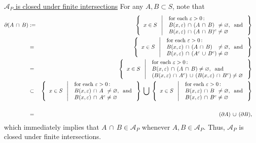 \vskip 0.2cm
\noindent
\underline{$\mathcal{A}_{P}$ is closed under finite intersections}
\vskip 0.1cm
\noindent
For any $A, B \subset S$, note that
\begin{eqnarray*}
\partial(A\,\cap\,B)
& := &
	\left\{\;\;
	x \in S
	\;\;\left\vert\;\;
	\begin{array}{l}
		\textnormal{for each $\varepsilon > 0$\,:}
		\\
		B(x,\varepsilon) \,\cap\,(A\,\cap\,B) \;\,\neq \varnothing,\;\;\textnormal{and}
		\\
		B(x,\varepsilon) \,\cap\,(A\,\cap\,B)^{c} \neq \varnothing
		\\
	\end{array}
	\right.
	\,\right\}
\\
& = &
	\left\{\;\;
	x \in S
	\;\;\left\vert\;\;
	\begin{array}{l}
		\textnormal{for each $\varepsilon > 0$\,:}
		\\
		B(x,\varepsilon) \,\cap\,(A\,\cap\,B) \;\;\;\neq \varnothing,\;\;\textnormal{and}
		\\
		B(x,\varepsilon) \,\cap\,(A^{c}\,\cup\,B^{c}) \neq \varnothing
		\\
	\end{array}
	\right.
	\,\right\}
\\
& = &
	\left\{\;\;
	x \in S
	\;\;\left\vert\;\;
	\begin{array}{l}
		\textnormal{for each $\varepsilon > 0$\,:}
		\\
		B(x,\varepsilon) \,\cap\,(A\,\cap\,B) \neq \varnothing,\;\;\textnormal{and}
		\\
		(B(x,\varepsilon) \,\cap\,A^{c})\,\cup\,(B(x,\varepsilon)\,\cap\,B^{c}) \neq \varnothing
		\\
	\end{array}
	\right.
	\,\right\}
\\
& \subset &
	\left\{\;\;
	x \in S
	\;\;\left\vert\;\;
	\begin{array}{l}
		\textnormal{for each $\varepsilon > 0$\,:}
		\\
		B(x,\varepsilon) \,\cap\,A  \;\,\neq \varnothing,\;\;\textnormal{and}
		\\
		B(x,\varepsilon) \,\cap\,A^{c}\neq \varnothing
		\\
	\end{array}
	\right.
	\,\right\}
	\;\bigcup\;
	\left\{\;\;
	x \in S
	\;\;\left\vert\;\;
	\begin{array}{l}
		\textnormal{for each $\varepsilon > 0$\,:}
		\\
		B(x,\varepsilon) \,\cap\,B  \;\,\neq \varnothing,\;\;\textnormal{and}
		\\
		B(x,\varepsilon) \,\cap\,B^{c}\neq \varnothing
		\\
	\end{array}
	\right.
	\,\right\}
\\
\\
&=& (\partial A) \,\cup\, (\partial B),
\end{eqnarray*}
which immediately implies that $A \,\cap\, B \in \mathcal{A}_{P}$ whenever $A, B \in \mathcal{A}_{P}$.
Thus, $\mathcal{A}_{P}$ is closed under finite intersections.

